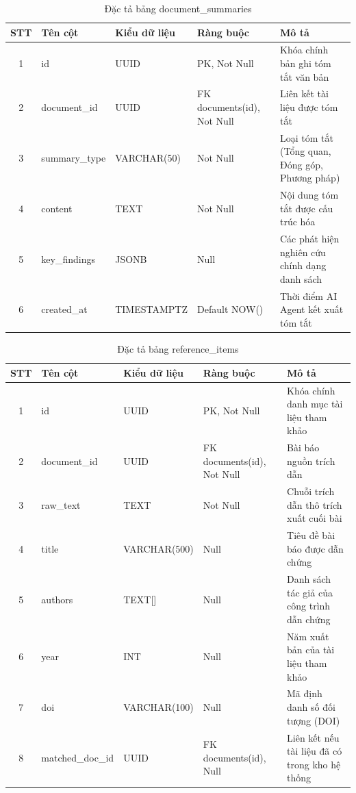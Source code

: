 \begin{table}[H]
\centering
\singlespacing
\fontsize{9pt}{11.5pt}\selectfont
\caption{Đặc tả bảng document\_summaries}
\label{tab:app_summaries}
\renewcommand{\arraystretch}{0.65}
\begin{tabularx}{\textwidth}{|c|>{\raggedright\arraybackslash}p{3.2cm}|>{\raggedright\arraybackslash}p{2.6cm}|>{\raggedright\arraybackslash}p{3.0cm}|>{\raggedright\arraybackslash}X|}
\hline
\textbf{STT} & \centering\textbf{Tên cột} & \centering\textbf{Kiểu dữ liệu} & \centering\textbf{Ràng buộc} & \centering\textbf{Mô tả} \tabularnewline \hline
1 & id & UUID & PK, Not Null & Khóa chính bản ghi tóm tắt văn bản \tabularnewline \hline
2 & document\_id & UUID & FK documents(id), Not Null & Liên kết tài liệu được tóm tắt \tabularnewline \hline
3 & summary\_type & VARCHAR(50) & Not Null & Loại tóm tắt (Tổng quan, Đóng góp, Phương pháp) \tabularnewline \hline
4 & content & TEXT & Not Null & Nội dung tóm tắt được cấu trúc hóa \tabularnewline \hline
5 & key\_findings & JSONB & Null & Các phát hiện nghiên cứu chính dạng danh sách \tabularnewline \hline
6 & created\_at & TIMESTAMPTZ & Default NOW() & Thời điểm AI Agent kết xuất tóm tắt \tabularnewline \hline
\end{tabularx}
\end{table}

\begin{table}[H]
\centering
\singlespacing
\fontsize{9pt}{11.5pt}\selectfont
\caption{Đặc tả bảng reference\_items}
\label{tab:app_references}
\vspace{-6pt}
\renewcommand{\arraystretch}{0.65}
\begin{tabularx}{\textwidth}{|c|>{\raggedright\arraybackslash}p{3.2cm}|>{\raggedright\arraybackslash}p{2.6cm}|>{\raggedright\arraybackslash}p{3.0cm}|>{\raggedright\arraybackslash}X|}
\hline
\textbf{STT} & \centering\textbf{Tên cột} & \centering\textbf{Kiểu dữ liệu} & \centering\textbf{Ràng buộc} & \centering\textbf{Mô tả} \tabularnewline \hline
1 & id & UUID & PK, Not Null & Khóa chính danh mục tài liệu tham khảo \tabularnewline \hline
2 & document\_id & UUID & FK documents(id), Not Null & Bài báo nguồn trích dẫn \tabularnewline \hline
3 & raw\_text & TEXT & Not Null & Chuỗi trích dẫn thô trích xuất cuối bài \tabularnewline \hline
4 & title & VARCHAR(500) & Null & Tiêu đề bài báo được dẫn chứng \tabularnewline \hline
5 & authors & TEXT[] & Null & Danh sách tác giả của công trình dẫn chứng \tabularnewline \hline
6 & year & INT & Null & Năm xuất bản của tài liệu tham khảo \tabularnewline \hline
7 & doi & VARCHAR(100) & Null & Mã định danh số đối tượng (DOI) \tabularnewline \hline
8 & matched\_doc\_id & UUID & FK documents(id), Null & Liên kết nếu tài liệu đã có trong kho hệ thống \tabularnewline \hline
\end{tabularx}
\end{table}

